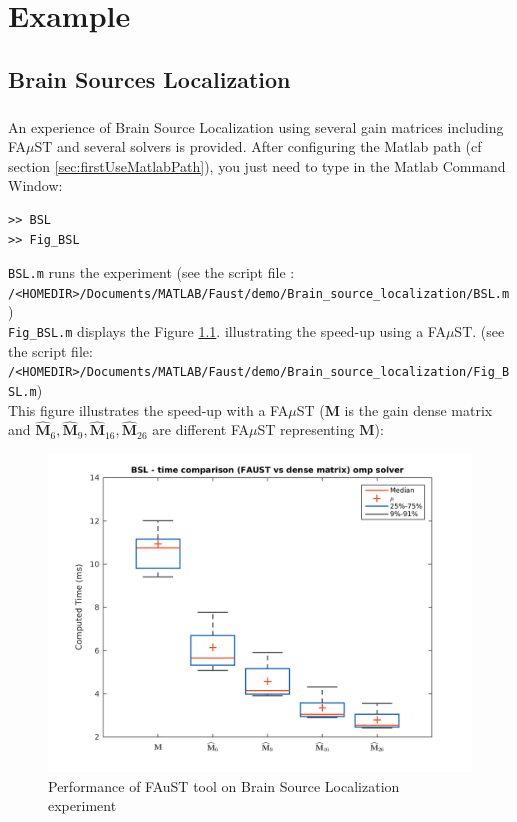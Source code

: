 \chapter{Example}\label{sec:example}

\section{Brain Sources Localization}\label{sec:BSL_example}
%



\paragraph{} An experience of Brain Source Localization using several gain matrices including FA$\mu$ST and several solvers is provided. After configuring the Matlab path (cf section \ref{sec:firstUseMatlabPath}), you just need to type in the Matlab Command Window:
\begin{lstlisting}
>> BSL
>> Fig_BSL
\end{lstlisting}

\texttt{BSL.m} runs the experiment (see the script file :\\
\texttt{/<HOMEDIR>/Documents/MATLAB/Faust/demo/Brain\_source\_localization/BSL.m})\\
\texttt{Fig\_BSL.m} displays the Figure \ref{fig:BSL}. illustrating the speed-up using a FA$\mu$ST. (see the script file:\\
\texttt{/<HOMEDIR>/Documents/MATLAB/Faust/demo/Brain\_source\_localization/Fig\_BSL.m}) \\

This figure illustrates the speed-up with a FA$\mu$ST ($\mathbf{M}$ is the gain dense matrix and $\widehat{\mathbf{M}}_{6},\widehat{\mathbf{M}}_{9},\widehat{\mathbf{M}}_{16},\widehat{\mathbf{M}}_{26}$ are different FA$\mu$ST representing  $\mathbf{M}$):


\begin{figure}[!h] %
\centering
\includegraphics[scale=0.7]{images/BSL.png}
\caption{Performance of FAuST tool on Brain Source Localization experiment}
\label{fig:BSL}
\end{figure}

